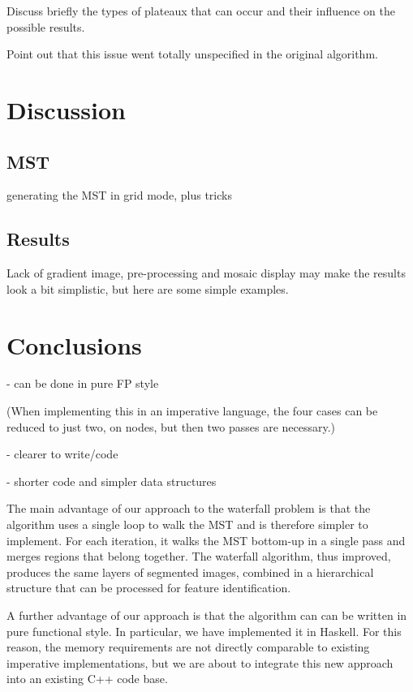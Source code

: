 \documentclass{jfp}
\begin{document}
Discuss briefly the types of plateaux that can occur and their
influence on the possible results.

Point out that this issue went totally unspecified in the original
algorithm.


\section{Discussion}

\subsection{MST}

generating the MST in grid mode, plus tricks

\subsection{Results}

Lack of gradient image, pre-processing and mosaic display may make the
results look a bit simplistic, but here are some simple examples.


\section{Conclusions}

 - can be done in pure FP style

(When implementing this in an imperative language, the four cases can
 be reduced to just two, on nodes, but then two passes are necessary.)

 - clearer to write/code

 - shorter code and simpler data structures


The main advantage of our approach to the waterfall problem is that
the algorithm uses a single loop to walk the MST and is therefore
simpler to implement. For each iteration, it walks the MST bottom-up
in a single pass and merges regions that belong together. The
waterfall algorithm, thus improved, produces the same layers of
segmented images, combined in a hierarchical structure that can be
processed for feature identification.

A further advantage of our approach is that the algorithm can can be
written in pure functional style. In particular, we have implemented
it in Haskell. For this reason, the memory requirements are not
directly comparable to existing imperative implementations, but we are
about to integrate this new approach into an existing C++ code base.
\end{document}

